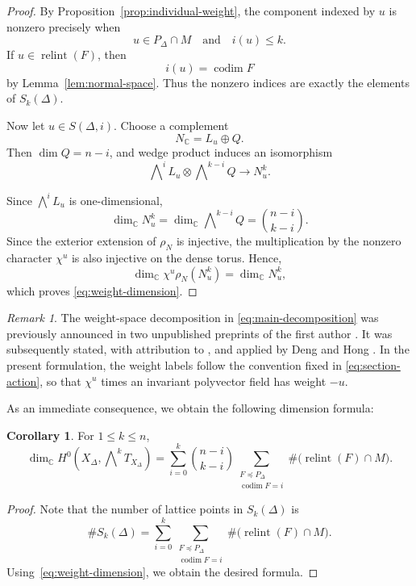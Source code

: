\documentclass[colorlinks,11pt,reqno]{amsart}
\theoremstyle{definition}
\newtheorem{corollary}[theorem]{Corollary}
\theoremstyle{remark}
\newtheorem{remark}[theorem]{Remark}
\numberwithin{equation}{section}
\numberwithin{equation}{section}
\newcommand{\CC}{\mathbb{C}}
\DeclareMathOperator{\relint}{relint}
\DeclareMathOperator{\codim}{codim}
\begin{document}
\begin{proof}
By Proposition~\ref{prop:individual-weight}, the component indexed
by \(u\) is nonzero precisely when
\[
u\in P_\Delta\cap M
\quad\text{and}\quad
i(u)\leq k.
\]
If \(u\in\relint(F)\), then
\[
i(u)=\codim F
\]
by Lemma~\ref{lem:normal-space}. Thus the nonzero indices are
exactly the elements of \(S_k(\Delta)\).

Now let \(u\in S(\Delta,i)\). Choose a complement
\[
N_{\CC}=L_u\oplus Q.
\]
Then \(\dim Q=n-i\), and wedge product induces an isomorphism
\[
\bigwedge\nolimits^iL_u
\otimes
\bigwedge\nolimits^{k-i}Q
\longrightarrow
N_u^k.
\]

Since \(\bigwedge^iL_u\) is one-dimensional,
\[
\dim_{\CC}N_u^k = \dim_{\CC}\bigwedge\nolimits^{k-i}Q = \binom{n-i}{k-i}.
\]
Since the exterior extension of \(\rho_N\) is injective, the multiplication by the nonzero
character \(\chi^u\) is also injective on the dense torus. Hence,
\[
\dim_{\CC}\chi^u\rho_N(N_u^k) = \dim_{\CC}N_u^k,
\]
which proves \eqref{eq:weight-dimension}.
\end{proof}

\begin{remark}\label{rem:main-provenance}
The weight-space decomposition in \eqref{eq:main-decomposition} was previously announced in two
unpublished preprints of the first author \cites{HongPoisson, HongPolyvector}. It was subsequently stated, with attribution to \cite{HongPolyvector}, and applied by Deng and Hong \cite{Deng-Hong 21}. In the present formulation, the weight labels follow the convention fixed in \eqref{eq:section-action}, so that \(\chi^u\) times an invariant polyvector field has weight \(-u\).
\end{remark}

As an immediate consequence, we obtain the following dimension formula:
\begin{corollary}\label{cor:dimension}
For \(1\leq k\leq n\),
\[
\dim_{\CC} H^0\!\left( X_\Delta,\bigwedge\nolimits^kT_{X_\Delta} \right)
= \sum_{i=0}^{k} \binom{n-i}{k-i} \sum_{\substack{F\preceq P_\Delta\\ \codim F=i}}
\#\bigl(\relint(F)\cap M\bigr).
\]
\end{corollary}
\begin{proof}
Note that the number of lattice points in $S_k(\Delta)$ is
\[
\#S_k(\Delta)=\sum_{i=0}^k\sum_{\substack{F\preceq P_\Delta\\ \codim F=i}}
\#\bigl(\relint(F)\cap M\bigr).
\]
Using~\eqref{eq:weight-dimension}, we obtain the desired formula.
\end{proof}
\end{document}
